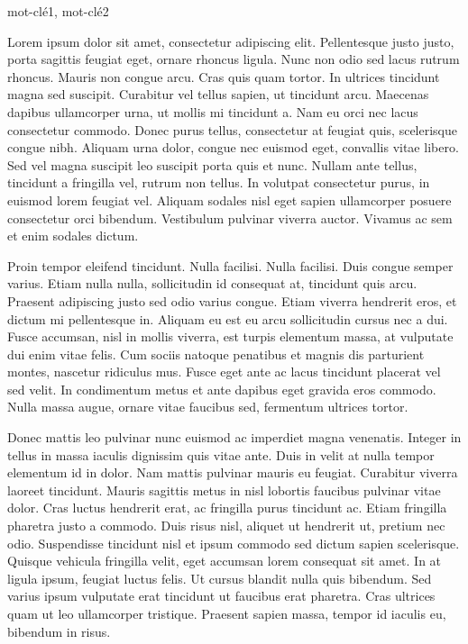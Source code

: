 \documentclass[letterpaper, twoside, 12pt,these,creativecommons,hyperref]{thETS}
\begin{document}
\begin{sommaire}{mot-clé1, mot-clé2}

Lorem ipsum dolor sit amet, consectetur adipiscing elit. Pellentesque justo justo, porta sagittis feugiat eget, ornare rhoncus ligula. Nunc non odio sed lacus rutrum rhoncus. Mauris non congue arcu. Cras quis quam tortor. In ultrices tincidunt magna sed suscipit. Curabitur vel tellus sapien, ut tincidunt arcu. Maecenas dapibus ullamcorper urna, ut mollis mi tincidunt a. Nam eu orci nec lacus consectetur commodo. Donec purus tellus, consectetur at feugiat quis, scelerisque congue nibh. Aliquam urna dolor, congue nec euismod eget, convallis vitae libero. Sed vel magna suscipit leo suscipit porta quis et nunc. Nullam ante tellus, tincidunt a fringilla vel, rutrum non tellus. In volutpat consectetur purus, in euismod lorem feugiat vel. Aliquam sodales nisl eget sapien ullamcorper posuere consectetur orci bibendum. Vestibulum pulvinar viverra auctor. Vivamus ac sem et enim sodales dictum.

Proin tempor eleifend tincidunt. Nulla facilisi. Nulla facilisi. Duis congue semper varius. Etiam nulla nulla, sollicitudin id consequat at, tincidunt quis arcu. Praesent adipiscing justo sed odio varius congue. Etiam viverra hendrerit eros, et dictum mi pellentesque in. Aliquam eu est eu arcu sollicitudin cursus nec a dui. Fusce accumsan, nisl in mollis viverra, est turpis elementum massa, at vulputate dui enim vitae felis. Cum sociis natoque penatibus et magnis dis parturient montes, nascetur ridiculus mus. Fusce eget ante ac lacus tincidunt placerat vel sed velit. In condimentum metus et ante dapibus eget gravida eros commodo. Nulla massa augue, ornare vitae faucibus sed, fermentum ultrices tortor.

Donec mattis leo pulvinar nunc euismod ac imperdiet magna venenatis. Integer in tellus in massa iaculis dignissim quis vitae ante. Duis in velit at nulla tempor elementum id in dolor. Nam mattis pulvinar mauris eu feugiat. Curabitur viverra laoreet tincidunt. Mauris sagittis metus in nisl lobortis faucibus pulvinar vitae dolor. Cras luctus hendrerit erat, ac fringilla purus tincidunt ac. Etiam fringilla pharetra justo a commodo. Duis risus nisl, aliquet ut hendrerit ut, pretium nec odio. Suspendisse tincidunt nisl et ipsum commodo sed dictum sapien scelerisque. Quisque vehicula fringilla velit, eget accumsan lorem consequat sit amet. In at ligula ipsum, feugiat luctus felis. Ut cursus blandit nulla quis bibendum. Sed varius ipsum vulputate erat tincidunt ut faucibus erat pharetra. Cras ultrices quam ut leo ullamcorper tristique. Praesent sapien massa, tempor id iaculis eu, bibendum in risus.


\end{sommaire}
\end{document}
